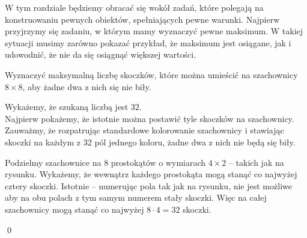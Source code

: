 


\noindent
W tym rozdziale będziemy obracać się wokół zadań, które polegają na konstruowaniu pewnych obiektów, spełniających pewne warunki. Najpierw przyjrzymy się zadaniu, w którym mamy wyznaczyć pewne maksimum. W takiej sytuacji musimy zarówno pokazać przykład, że maksimum jest osiągane, jak i udowodnić, że nie da się osiągnąć większej wartości.

\vspace{10px}


\noindent
Wyznaczyć maksymalną liczbę skoczków, które można umieścić na szachownicy $8\times8$, aby żadne dwa z nich się nie biły.


\noindent
Wykażemy, że szukaną liczbą jest $32$.\\
Najpierw pokażemy, że istotnie można postawić tyle skoczków na szachownicy. Zauważmy, że rozpatrując standardowe kolorowanie szachownicy i stawiając skoczki na każdym z 32 pól jednego koloru, żadne dwa z nich nie będą się biły.

\begin{center}
\end{center}

\noindent
Podzielmy szachownice na $8$ prostokątów o wymiarach $4\times2$ -- takich jak na rysunku. Wykażemy, że wewnątrz każdego prostokąta mogą stanąć co najwyżej cztery skoczki. Istotnie – numerując pola tak jak na rysunku, nie jest możliwe aby na obu polach z tym samym numerem stały skoczki. Więc na całej szachownicy mogą stanąć co najwyżej $8 \cdot 4 = 32$ skoczki.

\qed

\vspace{5px}

